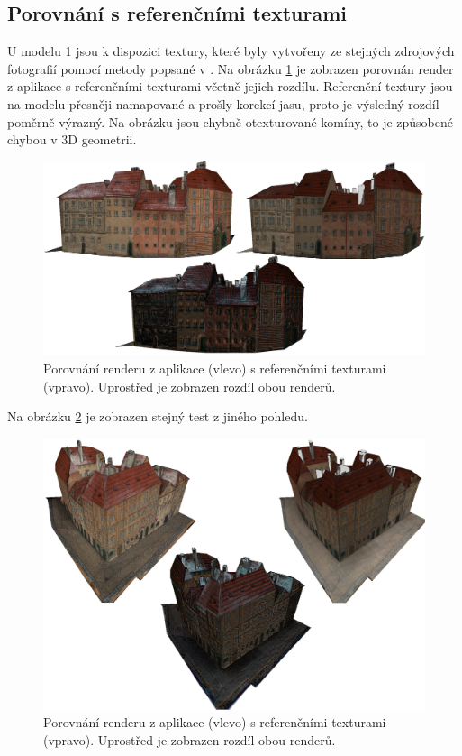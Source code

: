 \documentclass[11pt,twoside,a4paper]{book}
\begin{document}
\subsection{Porovnání s referenčními texturami}

U modelu 1 jsou k dispozici textury, které byly vytvořeny ze stejných zdrojových fotografií pomocí metody popsané v \cite{Sedlacek_phdthesis13}. Na obrázku \ref{fig:test-9} je zobrazen porovnán render z aplikace s referenčními texturami včetně jejich rozdílu. Referenční textury jsou na modelu přesněji namapované a prošly korekcí jasu, proto je výsledný rozdíl poměrně výrazný. Na obrázku jsou chybně otexturované komíny, to je způsobené chybou v 3D geometrii. 

\begin{figure}[h!]
\begin{center}
\includegraphics[width=\textwidth]{figures/test-9}
\caption{Porovnání renderu z aplikace (vlevo) s referenčními texturami (vpravo). Uprostřed je zobrazen rozdíl obou renderů.}
\label{fig:test-9}
\end{center}
\end{figure}

Na obrázku \ref{fig:test-10} je zobrazen stejný test z jiného pohledu.

\begin{figure}[h!]
\begin{center}
\includegraphics[width=\textwidth*3/4]{figures/test-10}
\caption{Porovnání renderu z aplikace (vlevo) s referenčními texturami (vpravo). Uprostřed je zobrazen rozdíl obou renderů.}
\label{fig:test-10}
\end{center}
\end{figure}
\end{document}
